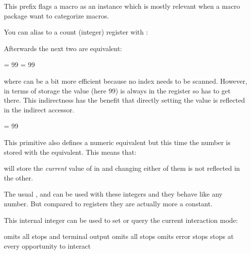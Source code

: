 \stopnewprimitive

\startnewprimitive[title={\prm {instance}}]

This prefix flags a macro as an instance which is mostly relevant when a macro
package want to categorize macros.

\stopnewprimitive

\startnewprimitive[title={\prm {integerdef}}]

You can alias to a count (integer) register with :

\starttyping
\countdef{}
\stoptyping

Afterwards the next two are equivalent:

\starttyping
\MyCount   = 99
 = 99
\stoptyping

where \type {\MyCount} can be a bit more efficient because no index needs to be
scanned. However, in terms of storage the value (here 99) is always in the register
so \type {\MyCount} has to get there. This indirectness has the benefit that directly
setting the value is reflected in the indirect accessor.

\starttyping
\integerdef\MyCount = 99
\stoptyping

This primitive also defines a numeric equivalent but this time the number is stored
with the equivalent. This means that:

\starttyping
\let\MyCopyOfCount = \MyCount
\stoptyping

will store the {\em current} value of \type {\MyCount} in \type {\MyCopyOfCount} and
changing either of them is not reflected in the other.

The usual ,  and  can be used with these
integers and they behave like any number. But compared to registers they are actually
more a constant.

\stopnewprimitive

\startoldprimitive[title={\prm {interactionmode}}]

This internal integer can be used to set or query the current interaction mode:

\starttabulate[||||]
\NC \type {\batchmode    } \NC \the\batchmodecode     \NC omits all stops and terminal output \NC \NR
\NC \type {\nonstopmode  } \NC \the\nonstopmodecode   \NC omits all stops \NC \NR
\NC \type {\scrollmode   } \NC \the\scrollmodecode    \NC omits error stops \NC \NR
\NC \type {\errorstopmode} \NC \the\errorstopmodecode \NC stops at every opportunity to interact \NC \NR
\stoptabulate

